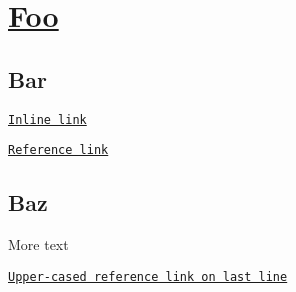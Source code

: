 \section*{\hyperlink{struct_foo}{Foo}}

\subsection*{Bar}

\href{http://example.com/inline}{\tt Inline link}

\href{http://example.com/reference}{\tt Reference link}

\subsection*{Baz}

More text

\href{http://example.com/last-line}{\tt Upper-\/cased reference link on last line} 